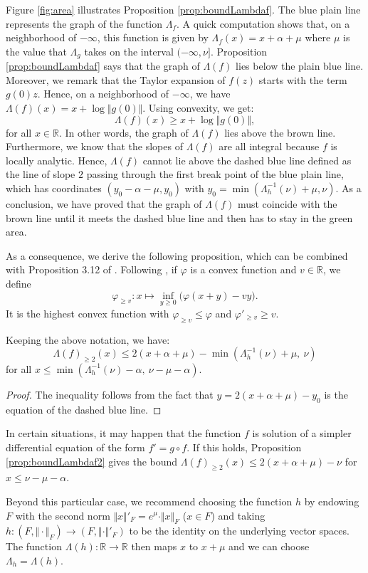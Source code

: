\documentclass{sig-alternate}
\newcommand{\R}{\mathbb R}
\begin{document}
Figure \ref{fig:area} illustrates Proposition \ref{prop:boundLambdaf}. 
The blue plain line represents the graph of the function $\Lambda_f$. A 
quick computation shows that, on a neighborhood of ${-}\infty$, this 
function is given by $\Lambda_f(x) = x + \alpha + \mu$
where $\mu$ is the value that $\Lambda_g$ takes on the interval 
$({-}\infty, \nu]$. Proposition \ref{prop:boundLambdaf} says that the
graph of $\Lambda(f)$ lies below the plain blue line. Moreover, we remark
that the Taylor expansion of $f(z)$ starts with the term
$g(0) z$. Hence, on a neighborhood of ${-}\infty$, we have 
$\Lambda(f)(x) = x + \log \Vert g(0) \Vert$. Using convexity, we 
get:
\[
\Lambda(f)(x) \geq x + \log \Vert g(0) \Vert,
\]
for all $x \in \R$.  In other words, the graph of $\Lambda(f)$ lies above the brown line.
Furthermore, we know that the slopes of $\Lambda(f)$ are all integral
because $f$ is locally analytic. Hence, $\Lambda(f)$ cannot lie above
the dashed blue line defined as the line of slope $2$ passing through
the first break point of the blue plain line, which has coordinates
$(y_0 - \alpha - \mu, y_0)$ with $y_0 = \min(\Lambda_h^{-1}(\nu) + \mu, 
\nu)$. As a conclusion, we have proved that the graph of $\Lambda(f)$ 
must coincide with the brown line until it meets the dashed blue line 
and then has to stay in the green area.

As a consequence, we derive the following 
proposition, which can be combined with Proposition 3.12 of 
\cite{caruso-roe-vaccon:14a}. Following \cite{caruso-roe-vaccon:14a},
if $\varphi$ is a convex function and $v \in \R$, we define
$$\varphi_{\geq v} : x \mapsto \inf_{y \geq 0} \big( \varphi(x+y)
- vy \big).$$
It is the highest convex function with $\varphi_{\geq v} \leq \varphi$ and 
$\varphi'_{\geq v} \geq v$.

\begin{prop}
\label{prop:boundLambdaf2}
Keeping the above notation, we have:
$$\Lambda(f)_{\geq 2} (x) \leq 2(x + \alpha + \mu) -
\min(\Lambda_h^{-1}(\nu) + \mu, \: \nu)$$
for all $x \leq \min(\Lambda_h^{-1}(\nu) - \alpha, \: \nu - \mu - \alpha)$.
\end{prop}

\begin{proof}
The inequality follows from the fact that $y = 2(x + \alpha + \mu) - y_0$ is the equation of 
the dashed blue line.
\end{proof}

\begin{rem}
In certain situations,
it may happen that the function $f$ is solution of a simpler 
differential equation of the form $f' = g \circ f$. If this holds, 
Proposition \ref{prop:boundLambdaf2} gives the bound $\Lambda(f)_{\geq 
2} (x) \leq 2(x + \alpha + \mu) - \nu$ for $x \leq \nu - \mu - \alpha$.

Beyond this particular case, we recommend choosing the 
function $h$ by endowing $F$ with the second norm $\Vert x \Vert'_F = 
e^\mu \cdot \Vert x \Vert_F$ ($x \in F$) and taking $h : (F, \Vert 
\cdot \Vert_F) \to (F, \Vert \cdot \Vert'_F)$ to be the identity on the
underlying vector spaces. The function $\Lambda(h) : \R \to \R$ then maps $x$ to $x + 
\mu$ and we can choose $\Lambda_h = \Lambda(h)$.
\end{rem}
\end{document}
